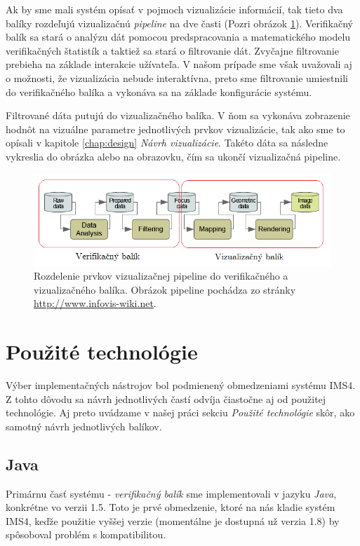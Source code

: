 Ak by sme mali systém opísať v pojmoch vizualizácie informácií, tak tieto dva balíky rozdeľujú vizualizačnú \textit{pipeline} na dve časti (Pozri obrázok \ref{fig:pipeline}). Verifikačný balík sa stará o analýzu dát pomocou predspracovania a matematického modelu verifikačných štatistík a taktiež sa stará o filtrovanie dát. Zvyčajne filtrovanie prebieha na základe interakcie užívateľa. V našom prípade sme však uvažovali aj o možnosti, že vizualizácia nebude interaktívna, preto sme filtrovanie umiestnili do verifikačného balíka a vykonáva sa na základe konfigurácie systému. 

Filtrované dáta putujú do vizualizačného balíka. V ňom sa vykonáva zobrazenie hodnôt na vizuálne parametre jednotlivých prvkov vizualizácie, tak ako sme to opísali v kapitole \ref{chap:design} \textit{Návrh vizualizácie}. Takéto dáta sa následne vykreslia do obrázka alebo na obrazovku, čím sa ukončí vizualizačná pipeline.

\begin{figure}
	\centering
	\includegraphics[width = 6in]{pipeline}
	\caption{Rozdelenie prvkov vizualizačnej pipeline do verifikačného a vizualizačného balíka. Obrázok pipeline pochádza zo stránky \protect\url{http://www.infovis-wiki.net}.}
	\label{fig:pipeline} 
\end{figure}

\section{Použité technológie}
Výber implementačných nástrojov bol podmienený obmedzeniami systému IMS4. Z tohto dôvodu sa návrh jednotlivých častí odvíja čiastočne aj od použitej technológie. Aj preto uvádzame v našej práci sekciu \textit{Použité technológie} skôr, ako samotný návrh jednotlivých balíkov.

\subsection{Java}
Primárnu časť systému - \textit{verifikačný balík} sme implementovali v jazyku \textit{Java}, konkrétne vo verzii 1.5. Toto je prvé obmedzenie, ktoré na nás kladie systém IMS4, keďže použitie vyššej verzie (momentálne je dostupná už verzia 1.8) by spôsoboval problém s kompatibilitou.

